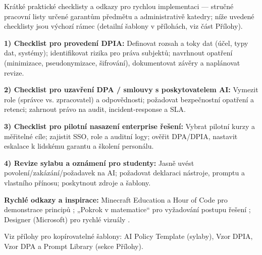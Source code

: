 Krátké praktické checklisty a odkazy pro rychlou implementaci — stručné pracovní listy určené garantům předmětu a administrativě katedry; níže uvedené checklisty jsou výchozí rámec (detailní šablony v přílohách, viz část Přílohy).

\medskip

\textbf{1) Checklist pro provedení DPIA:} Definovat rozsah a toky dat (účel, typy dat, systémy); identifikovat rizika pro práva subjektů; navrhnout opatření (minimizace, pseudonymizace, šifrování), dokumentovat závěry a naplánovat revize.

\medskip

\textbf{2) Checklist pro uzavření DPA / smlouvy s poskytovatelem AI:} Vymezit role (správce vs. zpracovatel) a odpovědnosti; požadovat bezpečnostní opatření a retenci; zahrnout právo na audit, incident‑response a SLA.

\medskip

\textbf{3) Checklist pro pilotní nasazení enterprise řešení:} Vybrat pilotní kurzy a měřitelné cíle; zajistit SSO, role a auditní logy; ověřit DPA/DPIA, nastavit eskalace k lidskému garantu a školení personálu.

\medskip

\textbf{4) Revize sylabu a oznámení pro studenty:} Jasně uvést povolení/zakázání/požadavek na AI; požadovat deklaraci nástroje, promptu a vlastního přínosu; poskytnout zdroje a šablony.

\medskip

\textbf{Rychlé odkazy a inspirace:} Minecraft Education a Hour of Code pro demonstrace principů \cite{kb_ai_101_tipu_pdf_04e4a115_page_15_2}; „Pokrok v matematice“ pro vyžadování postupu řešení \cite{kb_ai_101_tipu_pdf_04e4a115_page_8_1}; Designer (Microsoft) pro rychlé vizuály \cite{kb_ai_101_tipu_pdf_04e4a115_page_51_1}.

Viz přílohy pro kopírovatelné šablony: AI Policy Template (sylaby), Vzor DPIA, Vzor DPA a Prompt Library (sekce Přílohy).